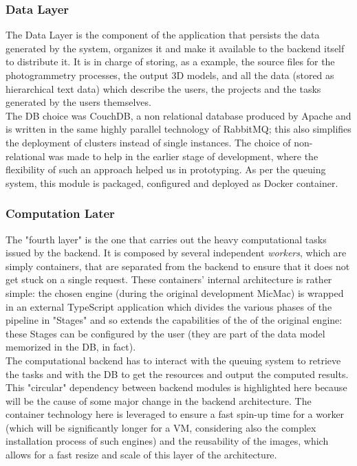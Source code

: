   \subsubsection{Data Layer}
  \label{ssse:originaldatalayer}
    The Data Layer is the component of the application that persists the data generated by the system, organizes it and make it available to the backend itself to distribute it. It is in charge of storing, as a example, the source files for the photogrammetry processes, the output 3D models, and all the data (stored as hierarchical text data) which describe the users, the projects and the tasks generated by the users themselves.\\
    The DB choice was CouchDB, a non relational database produced by Apache and is written in the same highly parallel technology of RabbitMQ; this also simplifies the deployment of clusters instead of single instances. The choice of non-relational was made to help in the earlier stage of development, where the flexibility of such an approach helped us in prototyping. As per the queuing system, this module is packaged, configured and deployed as Docker container.
    
  \subsubsection{Computation Later}
  \label{ssse:originalcomputationlayer}
    The "fourth layer" is the one that carries out the heavy computational tasks issued by the backend. It is composed by several independent \textit{workers}, which are simply containers, that are separated from the backend to ensure that it does not get stuck on a single request. These containers' internal architecture is rather simple: the chosen engine (during the original development MicMac) is wrapped in an external TypeScript application which divides the various phases of the pipeline in "Stages" and so extends the capabilities of the of the original engine: these Stages can be configured by the user (they are part of the data model memorized in the DB, in fact).\\
    The computational backend has to interact with the queuing system to retrieve the tasks and with the DB to get the resources and output the computed results. This "circular" dependency between backend modules is highlighted here because will be the cause of some major change in the backend architecture. The container technology here is leveraged to ensure a fast spin-up time for a worker (which will be significantly longer for a VM, considering also the complex installation process of such engines) and the reusability of the images, which allows for a fast resize and scale of this layer of the architecture.
